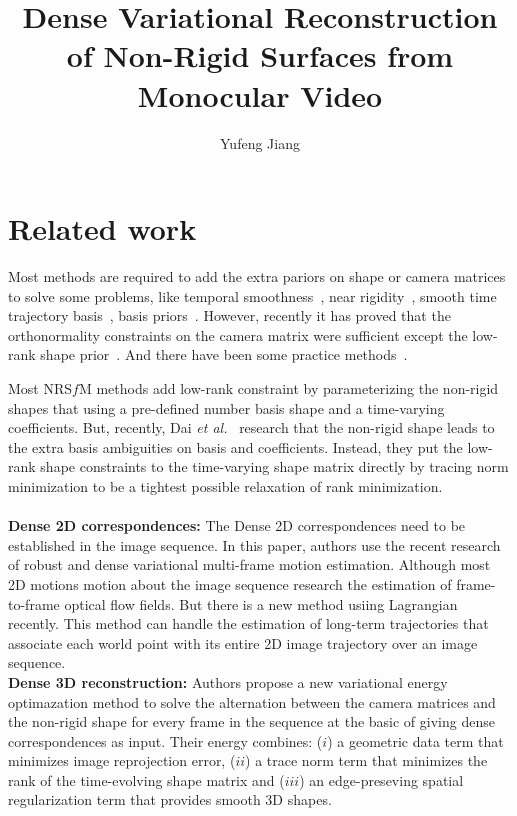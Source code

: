 \documentclass[10pt,twocolumn,letterpaper]{article}
\begin{document}
\title{Dense Variational Reconstruction of Non-Rigid Surfaces from Monocular Video}
\author{Yufeng Jiang}
\maketitle
\balance

\section{Related work}

Most methods are required to add the extra pariors on shape or camera matrices to solve some problems, like temporal smoothness~\cite{Non}, near rigidity~\cite{Non}, smooth time trajectory basis~\cite{Trajectory}, basis priors~\cite{first}. However, recently it has proved that the orthonormality constraints on the camera matrix were sufficient except the low-rank shape prior~\cite{In}. And there have been some practice methods~\cite{A,Optimal}.

Most NRS$f$M methods add low-rank constraint by parameterizing the non-rigid shapes that using a pre-defined number basis shape and a time-varying coefficients. But, recently, Dai \emph{et al.}~\cite{A} research that the non-rigid shape leads to the extra basis ambiguities on basis and coefficients. Instead, they put the low-rank shape constraints to the time-varying shape matrix directly by tracing norm minimization to be a tightest possible relaxation of rank minimization. \\ \\
{\bf Dense 2D correspondences:} The Dense 2D correspondences need to be established in the image sequence. In this paper, authors use the recent research of robust and dense variational multi-frame motion estimation. Although most 2D motions motion about the image sequence research the estimation of frame-to-frame optical flow fields. But there is a new method usiing Lagrangian recently. This method can handle the estimation of long-term trajectories that associate each world point with its entire 2D image trajectory over an image sequence. \\
{\bf Dense 3D reconstruction:} Authors propose a new variational energy optimazation method to solve the alternation between the camera matrices and the non-rigid shape for every frame in the sequence at the basic of giving dense correspondences as input. Their energy combines: ($i$) a geometric data term that minimizes image reprojection error, ($ii$) a trace norm term that minimizes the rank of the time-evolving shape matrix and ($iii$) an edge-preseving spatial regularization term that provides smooth 3D shapes.
\end{document}

